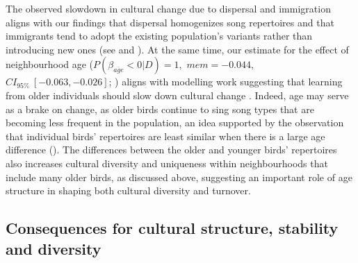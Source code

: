 The observed slowdown in cultural change due to dispersal and immigration aligns with our findings that dispersal homogenizes song repertoires and that immigrants tend to adopt the existing population's variants rather than introducing new ones (see  and ). At the same time, our estimate for the effect of neighbourhood age ($P(\beta_{\overline{age}} < 0 | D) = 1,$ $mem=-0.044,$ $CI_{95\%}~[-0.063, -0.026]$; ) aligns with modelling work suggesting that learning from older individuals should slow down cultural change \autocite{kirby2021}. Indeed, age may serve as a brake on change, as older birds continue to sing song types that are becoming less frequent in the population, an idea supported by the observation that individual birds' repertoires are least similar when there is a large age difference (). The differences between the older and younger birds' repertoires also increases cultural diversity and uniqueness within neighbourhoods that include many older birds, as discussed above, suggesting an important role of age structure in shaping both cultural diversity and turnover.

\subsection{Consequences for cultural structure, stability and diversity}

